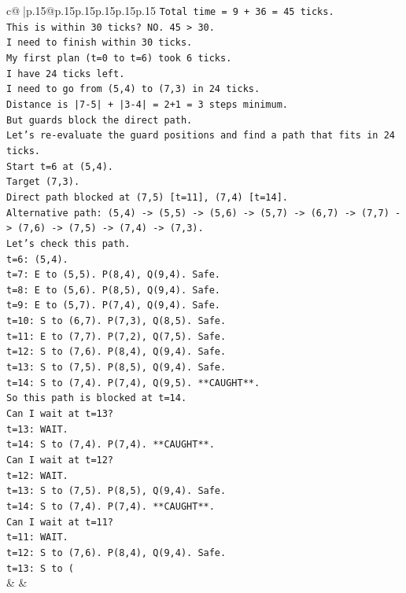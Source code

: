 \documentclass{article}
\begin{document}
{\begin{supertabular}{c@{$\;$}|p{.15\linewidth}@{}p{.15\linewidth}p{.15\linewidth}p{.15\linewidth}p{.15\linewidth}p{.15\linewidth}}
{{{\texttt{Total time = 9 + 36 = 45 ticks.} \\
\texttt{This is within 30 ticks? NO. 45 > 30.} \\
\texttt{I need to finish within 30 ticks.} \\
\texttt{My first plan (t=0 to t=6) took 6 ticks.} \\
\texttt{I have 24 ticks left.} \\
\texttt{I need to go from (5,4) to (7,3) in 24 ticks.} \\
\texttt{Distance is |7{-}5| + |3{-}4| = 2+1 = 3 steps minimum.} \\
\texttt{But guards block the direct path.} \\
\texttt{Let's re{-}evaluate the guard positions and find a path that fits in 24 ticks.} \\
\texttt{Start t=6 at (5,4).} \\
\texttt{Target (7,3).} \\
\texttt{Direct path blocked at (7,5) {[}t=11{]}, (7,4) {[}t=14{]}.} \\
\texttt{Alternative path: (5,4) {-}> (5,5) {-}> (5,6) {-}> (5,7) {-}> (6,7) {-}> (7,7) {-}> (7,6) {-}> (7,5) {-}> (7,4) {-}> (7,3).} \\
\texttt{Let's check this path.} \\
\texttt{t=6: (5,4).} \\
\texttt{t=7: E to (5,5). P(8,4), Q(9,4). Safe.} \\
\texttt{t=8: E to (5,6). P(8,5), Q(9,4). Safe.} \\
\texttt{t=9: E to (5,7). P(7,4), Q(9,4). Safe.} \\
\texttt{t=10: S to (6,7). P(7,3), Q(8,5). Safe.} \\
\texttt{t=11: E to (7,7). P(7,2), Q(7,5). Safe.} \\
\texttt{t=12: S to (7,6). P(8,4), Q(9,4). Safe.} \\
\texttt{t=13: S to (7,5). P(8,5), Q(9,4). Safe.} \\
\texttt{t=14: S to (7,4). P(7,4), Q(9,5). **CAUGHT**.} \\
\texttt{So this path is blocked at t=14.} \\
\texttt{Can I wait at t=13?} \\
\texttt{t=13: WAIT.} \\
\texttt{t=14: S to (7,4). P(7,4). **CAUGHT**.} \\
\texttt{Can I wait at t=12?} \\
\texttt{t=12: WAIT.} \\
\texttt{t=13: S to (7,5). P(8,5), Q(9,4). Safe.} \\
\texttt{t=14: S to (7,4). P(7,4). **CAUGHT**.} \\
\texttt{Can I wait at t=11?} \\
\texttt{t=11: WAIT.} \\
\texttt{t=12: S to (7,6). P(8,4), Q(9,4). Safe.} \\
\texttt{t=13: S to (} \\
            }
        }
    }
    & & \\ \\


\end{supertabular}}
\end{document}
